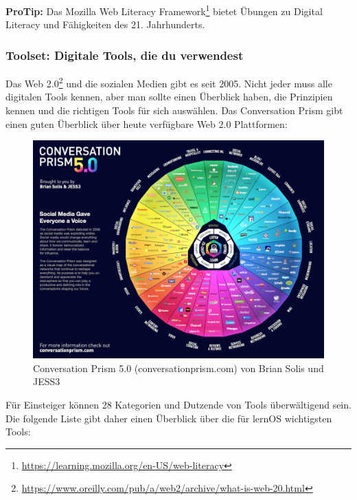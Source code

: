 \documentclass[
  ngerman,
  paper=a4,
,captions=tableheading
]{scrartcl}
\DeclareRobustCommand{\href}[2]{#2\footnote{\url{#1}}}
\begin{document}
\textbf{ProTip:} Das Mozilla
\href{https://learning.mozilla.org/en-US/web-literacy}{Web Literacy
Framework} bietet Übungen zu Digital Literacy und Fähigkeiten des 21.
Jahrhunderts.

\hypertarget{toolset-digitale-tools-die-du-verwendest}{%
\subsubsection{Toolset: Digitale Tools, die du
verwendest}\label{toolset-digitale-tools-die-du-verwendest}}

Das
\href{https://www.oreilly.com/pub/a/web2/archive/what-is-web-20.html}{Web
2.0} und die sozialen Medien gibt es seit 2005. Nicht jeder muss alle
digitalen Tools kennen, aber man sollte einen Überblick haben, die
Prinzipien kennen und die richtigen Tools für sich auswählen. Das
Conversation Prism gibt einen guten Überblick über heute verfügbare Web
2.0 Plattformen:

\begin{figure}
\centering
\includegraphics{./tex2pdf.-af94b87e0fdb9aa6/6b3c3be66bbf7be83f482f370fe8c95d5cbaa199.png}
\caption{Conversation Prism 5.0 (conversationprism.com) von Brian Solis
und JESS3}
\end{figure}

Für Einsteiger können 28 Kategorien und Dutzende von Tools überwältigend
sein. Die folgende Liste gibt daher einen Überblick über die für lernOS
wichtigsten Tools:
\end{document}

